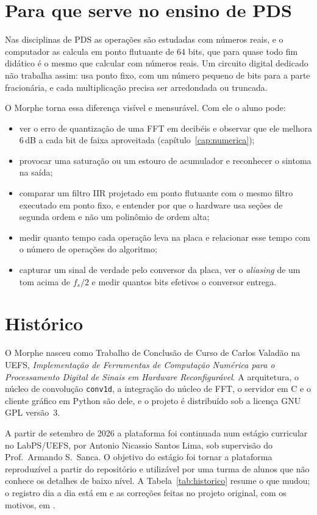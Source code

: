 \section{Para que serve no ensino de PDS}

Nas disciplinas de PDS as operações são estudadas com números reais, e o
computador as calcula em ponto flutuante de 64 bits, que para quase todo fim
didático é o mesmo que calcular com números reais. Um circuito digital dedicado
não trabalha assim: usa ponto fixo, com um número pequeno de bits para a parte
fracionária, e cada multiplicação precisa ser arredondada ou truncada.

O Morphe torna essa diferença visível e mensurável. Com ele o aluno pode:

\begin{itemize}
  \item ver o erro de quantização de uma FFT em decibéis e observar que ele
    melhora 6\,dB a cada bit de faixa aproveitada (capítulo~\ref{cap:numerica});
  \item provocar uma saturação ou um estouro de acumulador e reconhecer o
    sintoma na saída;
  \item comparar um filtro IIR projetado em ponto flutuante com o mesmo filtro
    executado em ponto fixo, e entender por que o hardware usa seções de segunda
    ordem e não um polinômio de ordem alta;
  \item medir quanto tempo cada operação leva na placa e relacionar esse tempo
    com o número de operações do algoritmo;
  \item capturar um sinal de verdade pelo conversor da placa, ver o
    \emph{aliasing} de um tom acima de \(f_s/2\) e medir quantos bits efetivos
    o conversor entrega.
\end{itemize}

\section{Histórico}

O Morphe nasceu como Trabalho de Conclusão de Curso de Carlos Valadão na UEFS,
\emph{Implementação de Ferramentas de Computação Numérica para o Processamento
Digital de Sinais em Hardware Reconfigurável}. A arquitetura, o núcleo de
convolução \texttt{conv1d}, a integração do núcleo de FFT, o servidor em C e o
cliente gráfico em Python são dele, e o projeto é distribuído sob a licença GNU
GPL versão~3.

A partir de setembro de 2026 a plataforma foi continuada num estágio curricular
no LabPS/UEFS, por Antonio Nicassio Santos Lima, sob supervisão do Prof.\ Armando
S.\ Sanca. O objetivo do estágio foi tornar a plataforma reproduzível a partir do
repositório e utilizável por uma turma de alunos que não conhece os detalhes de
baixo nível. A Tabela~\ref{tab:historico} resume o que mudou; o registro dia a
dia está em  e as correções feitas no projeto original, com
os motivos, em .

